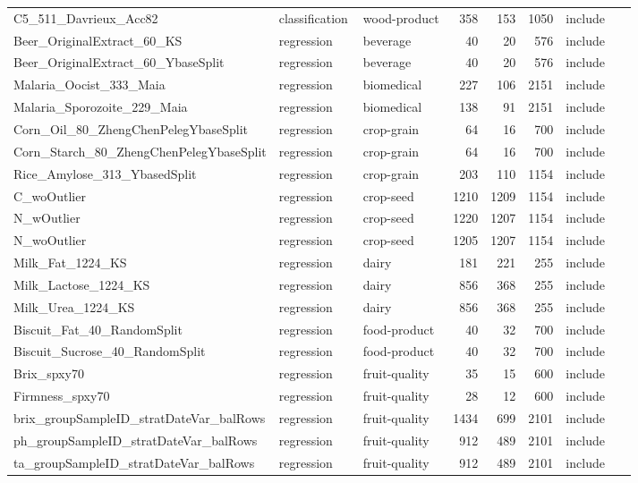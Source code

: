 \begin{longtable}{L{0.34\linewidth}L{0.14\linewidth}L{0.18\linewidth}rrrL{0.15\linewidth}}
C5\_511\_Davrieux\_Acc82 & classification & wood-product & 358 & 153 & 1050 & include \\
Beer\_OriginalExtract\_60\_KS & regression & beverage & 40 & 20 & 576 & include \\
Beer\_OriginalExtract\_60\_YbaseSplit & regression & beverage & 40 & 20 & 576 & include \\
Malaria\_Oocist\_333\_Maia & regression & biomedical & 227 & 106 & 2151 & include \\
Malaria\_Sporozoite\_229\_Maia & regression & biomedical & 138 & 91 & 2151 & include \\
Corn\_Oil\_80\_ZhengChenPelegYbaseSplit & regression & crop-grain & 64 & 16 & 700 & include \\
Corn\_Starch\_80\_ZhengChenPelegYbaseSplit & regression & crop-grain & 64 & 16 & 700 & include \\
Rice\_Amylose\_313\_YbasedSplit & regression & crop-grain & 203 & 110 & 1154 & include \\
C\_woOutlier & regression & crop-seed & 1210 & 1209 & 1154 & include \\
N\_wOutlier & regression & crop-seed & 1220 & 1207 & 1154 & include \\
N\_woOutlier & regression & crop-seed & 1205 & 1207 & 1154 & include \\
Milk\_Fat\_1224\_KS & regression & dairy & 181 & 221 & 255 & include \\
Milk\_Lactose\_1224\_KS & regression & dairy & 856 & 368 & 255 & include \\
Milk\_Urea\_1224\_KS & regression & dairy & 856 & 368 & 255 & include \\
Biscuit\_Fat\_40\_RandomSplit & regression & food-product & 40 & 32 & 700 & include \\
Biscuit\_Sucrose\_40\_RandomSplit & regression & food-product & 40 & 32 & 700 & include \\
Brix\_spxy70 & regression & fruit-quality & 35 & 15 & 600 & include \\
Firmness\_spxy70 & regression & fruit-quality & 28 & 12 & 600 & include \\
brix\_groupSampleID\_stratDateVar\_balRows & regression & fruit-quality & 1434 & 699 & 2101 & include \\
ph\_groupSampleID\_stratDateVar\_balRows & regression & fruit-quality & 912 & 489 & 2101 & include \\
ta\_groupSampleID\_stratDateVar\_balRows & regression & fruit-quality & 912 & 489 & 2101 & include \\

\end{longtable}
